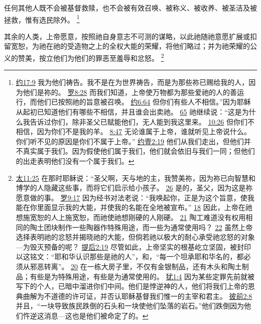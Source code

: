 \documentclass[12pt, a4paper, oneside]{ctexart}
\newcounter{parnum}[section]
\newcommand{\N}{%
   \noindent\refstepcounter{parnum}%
    \makebox[\parindent][l]{\textbf{\arabic{parnum}.}}}
\begin{document}
	任何其他人既不会被基督救赎，也不会被有效召唤、被称义、被收养、被圣洁及被拯救，惟有选民除外。
	\footnote {
		\href{https://biblehub.com/john/17-9.htm}{约17:9} 我为他们祷告。我不是在为世界祷告，而是为那些祢已赐给我的人，因为他们是祢的。
		\href{https://biblehub.com/romans/8-28.htm}{罗8:28} 而我们知道，上帝使万物都为那些爱祂的人的善运行，而他们已按照祂的旨意被召唤。
		\href{https://biblehub.com/john/6-64.htm}{约6:64} 但你们有些人不相信。”因为耶稣从起初已知道他们有哪些不相信，并且谁会出卖祂。
		\href{https://biblehub.com/john/6-65.htm}{65} 祂继续说：“这是为什么我告诉过你们，除非圣父已赋能他们，无人能到我这里来。
		\href{https://biblehub.com/john/10-26.htm}{10:26} 但你们不相信，因为你们不是我的羊。
		\href{https://biblehub.com/john/8-47.htm}{8:47} 无论谁属于上帝，谁就听见上帝说什么。你们听不见的原因是你们不属于上帝。”
		\href{https://biblehub.com/1_john/2-19.htm}{约壹2:19} 他们从我们走出，但他们并不真实属于我们。因为假使他们属于我们，他们就会依旧与我们一同；但他们的出走表明他们没有一个属于我们。
	}

\N 其余的人类，上帝愿意，按照祂自身意志不可测的谋略，以此祂随祂意愿扩展或扣留宽恕，为祂在祂的受造物之上的全权大能的荣耀，将他们略过；并为祂荣耀的公义的赞美，按立他们为他们的罪恶至羞辱和忿怒。
	\footnote {
		\href{https://biblehub.com/matthew/11-25.htm}{太11:25} 在那时耶稣说：“圣父啊，天与地的主，我赞美祢，因为祢已向智慧和博学的人隐藏这些事，而将它们启示给小孩子。
		\href{https://biblehub.com/matthew/11-26.htm}{26} 是的，圣父，因为这是祢愿意做的事。
		\href{https://biblehub.com/romans/9-17.htm}{罗9:17} 因为经书对法老说：“我唤起你，正是为这个旨意，使我能在你里面显示我的大能，并使我的名能在全地被宣布。”
		\href{https://biblehub.com/romans/9-18.htm}{18} 因此，上帝在祂想施宽恕的人上施宽恕，而祂使祂想刚硬的人刚硬。
		\href{https://biblehub.com/romans/9-21.htm}{21} 陶工难道没有权用相同的陶土团块制作一些陶器作特殊用途，而一些为通常使用吗？
		\href{https://biblehub.com/romans/9-22.htm}{22} 虽然上帝选择表明祂的忿怒并揭晓祂的大能，但倘若祂以极大的耐心承受祂忿怒的对象---为毁灭预备的呢？
		\href{https://biblehub.com/2_timothy/2-19.htm}{提后2:19} 尽管如此，上帝坚实的根基屹立坚固，被封印以这铭文：“耶和华认识那些是祂的人”，和，“每一个坦承耶和华名的，都必须从邪恶转离”。
		\href{https://biblehub.com/2_timothy/2-20.htm}{20} 在一栋大房子里，不仅有金银制品，还有木头和陶土制品；有些是为特殊用途，有些是为通常使用的。
		\href{https://biblehub.com/jude/1-4.htm}{犹1:4} 因为某些定罪先前就被写下的个人，已暗中溜进你们中间。他们是悖逆神的人，他们将我们上帝的恩典曲解为不道德的许可证，并否认耶稣基督我们惟一的主宰和君主。
		\href{https://biblehub.com/1_peter/2-8.htm}{彼前2:8} 并且，“一块导致族民跌倒的石头和一块使他们坠落的岩石。”他们跌倒因为他们忤逆这消息---这也是他们被命定了的。
	}
\end{document}
